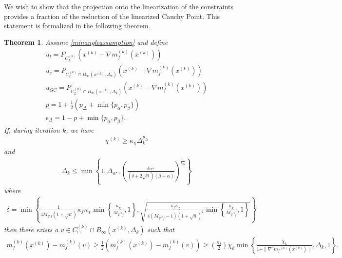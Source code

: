\documentclass{article}
\newtheorem{theorem}{Theorem}[section]
\theoremstyle{case}
\newcommand{\xk}{{x^{(k)}}}
\newcommand{\dk}{\Delta_k}
\newcommand{\gfmin}{M_{\nabla f}}
\newcommand{\mfk}{{{m}_f}^{(k)}}
\newcommand{\chik}{{\chi^{(k)}}}
\newcommand{\gk}{{\nabla m_f^{(k)}(x^{(k)})}}
\newcommand{\capcones}{{C^{(k)}_{\cap}}}
\newcommand{\linearization}{{C^{(k)}_{L}}}
\newcommand{\minangledelta}{{\Delta_{\alpha^{\star}}}}
\newcommand{\minanglealpha}{{ \alpha^{\star} }}
\newcommand{\tr}{{ B_{\infty}\left(\xk, \dk\right) }}
\newcommand{\hfb}{{M_{\nabla^2 f}}}
\begin{document}
We wish to show that the projection onto the linearization of the constraints provides a fraction of the reduction of the linearized Cauchy Point.
This statement is formalized in the following theorem.

\begin{theorem}
\label{sufficient_reduction_theorem}
Assume
\cref{minangleassumption}
and define 
\begin{align}
u_l = P_{\linearization}(\xk - \gk) \\
u_c = P_{\capcones\cap\tr}(\xk-\gk) \label{sr_define_u_c} \\
u_{GC} = P_{\linearization\cap\tr}(\xk-\gk) \\
p = 1 + \frac 1 2 \left(p_{\Delta} + \min\{p_{\alpha}, p_{\beta}\}\right) \label{sr_def_p}\\
\epsilon_{\Delta} = 1-p+\min\{p_{\alpha}, p_{\beta}\}. \label{sr_def_epsilon_delta}
\end{align}
If, during iteration $k$, we have
\begin{align}
\chik \ge \kappa_{\chi} \dk^{p_{\Delta}} \label{sr_chi_big_enough}
\end{align}
and
\begin{align}
\dk \le \min\left\{
1,
\minangledelta,
\left(\frac{\delta \minanglealpha}{\left(\delta + 2\sqrt{n}\right)\left(\beta +\alpha\right)}\right)^{\frac 1 {\epsilon_{\Delta}}}
\right\} \label{sr_delta_small_enough}
\end{align}
where
\begin{align}
\delta = \min\left\{\frac 1 {4\gfmin(1 + \sqrt{n})} \kappa_f \kappa_{\chi} \min\left\{ \frac{\kappa_{\chi}}{\hfb}, 1 \right\}, \sqrt{\frac{\kappa_f \kappa_{\chi}}{4\left(\hfb - 1\right)\left(1 + \sqrt{n}\right)^2} \min\left\{ \frac{\kappa_{\chi}}{\hfb}, 1 \right\}}\right\} \label{sr_define_delta}
\end{align}
then there exists a $v \in \capcones \cap \tr$ such that
\begin{align*}
m_f^{(k)}(\xk) - m_f^{(k)}(v) \ge \frac 1 2 \left(m_f^{(k)}(\xk) - m_f^{(k)}(v)\right) \ge \left(\frac{\kappa_f}{2} \right)\chi_k \min\left\{ \frac{\chi_k}{1+\|\nabla^2 \mfk(\xk)\|}, \dk, 1 \right\}.
\end{align*}
\end{theorem}
\end{document}
